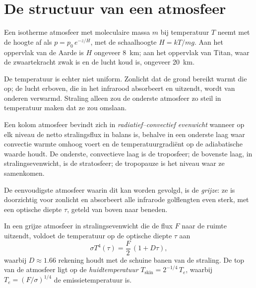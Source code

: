 \section{De structuur van een atmosfeer}\label{sec:b3:planetary-atmospheres:structure}

Een isotherme atmosfeer met moleculaire massa $m$ bij temperatuur $T$ neemt met de hoogte af
als $p = p_0\,e^{-z/H}$, met de schaalhoogte $H = kT/mg$. Aan het oppervlak van de
Aarde is $H$ ongeveer \qty{8}{km}; aan het oppervlak van
Titan, waar de zwaartekracht zwak is en de lucht koud is, ongeveer \qty{20}{km}.

De temperatuur is echter niet uniform. Zonlicht dat de grond bereikt
warmt die op; de lucht erboven, die in het infrarood absorbeert en uitzendt, wordt
van onderen verwarmd. Straling alleen zou de onderste atmosfeer zo steil
in temperatuur maken dat ze zou omslaan.

\begin{definition}\label{def:b3:planetary-atmospheres:rce}
Een kolom atmosfeer bevindt zich in \emph{radiatief--convectief
evenwicht} wanneer op elk
niveau de netto stralingsflux in balans is, behalve in een onderste laag
waar convectie warmte omhoog voert en de temperatuurgradiënt
op de adiabatische waarde houdt. De onderste, convectieve laag is de troposfeer; de
bovenste laag, in stralingsevenwicht, is de stratosfeer; de tropopauze
is het niveau waar ze samenkomen.
\end{definition}

De eenvoudigste atmosfeer waarin dit kan worden gevolgd, is de \emph{grijze}: ze
is doorzichtig voor zonlicht en absorbeert alle infrarode golflengten even sterk,
met een optische diepte $\tau$, geteld van boven naar beneden.

\begin{proposition}\label{prop:b3:planetary-atmospheres:grey}
In een grijze atmosfeer in stralingsevenwicht die de flux $F$ naar
de ruimte uitzendt, voldoet de temperatuur op de optische diepte $\tau$ aan
\[
\sigma T^4(\tau) = \frac F2\,(1 + D\tau),
\]
waarbij $D \approx 1.66$ rekening houdt met de schuine banen van de straling.
De top van de atmosfeer ligt op de \emph{huidtemperatuur}
$T_\mathrm{skin} = 2^{-1/4}\,T_e$, waarbij $T_e = (F/\sigma)^{1/4}$ de
emissietemperatuur is.
\end{proposition}


